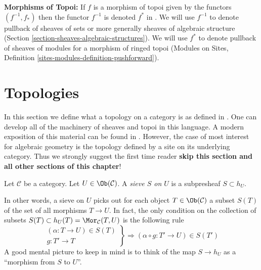 \medskip\noindent
{\bf Morphisms of Topoi:} If $f$ is a morphism of topoi given
by the functors $(f^{-1}, f_*)$ then the functor $f^{-1}$
is denoted $f^*$ in \cite[Exposee IV, Definition 3.1]{SGA4}.
We will use $f^{-1}$ to denote pullback of sheaves of sets
or more generally sheaves of algebraic structure
(Section \ref{section-sheaves-algebraic-structures}).
We will use $f^*$ to denote pullback of sheaves of modules
for a morphism of ringed topoi
(Modules on Sites, Definition \ref{sites-modules-definition-pushforward}).



\section{Topologies}
\label{section-topologies}

\noindent
In this section we define what a topology on a category is as
defined in \cite{SGA4}. One can develop all of the machinery of
sheaves and topoi in this language. A modern exposition of this material
can be found in \cite{KS}. However, the case of most interest for algebraic
geometry is the topology defined by a site on its underlying category.
Thus we strongly suggest the first time reader
{\bf skip this section and all other sections of this chapter}!

\begin{definition}
\label{definition-sieve}
Let $\mathcal{C}$ be a category. Let $U \in \Ob(\mathcal{C})$.
A {\it sieve $S$ on $U$} is a subpresheaf $S \subset h_U$.
\end{definition}

\noindent
In other words, a sieve on $U$ picks out for each object
$T \in \Ob(\mathcal{C})$ a subset $S(T)$ of the set
of all morphisms $T \to U$. In fact, the only condition
on the collection of subsets
$S(T) \subset h_U(T) = \Mor_\mathcal{C}(T, U)$
is the following rule
\begin{equation}
\label{equation-property-sieve}
\left.
\begin{matrix}
(\alpha : T \to U) \in S(T) \\
g : T' \to T
\end{matrix}
\right\} \Rightarrow
(\alpha \circ g : T' \to U) \in S(T')
\end{equation}
A good mental picture to keep in mind is to think of the
map $S \to h_U$ as a ``morphism from $S$ to $U$''.

